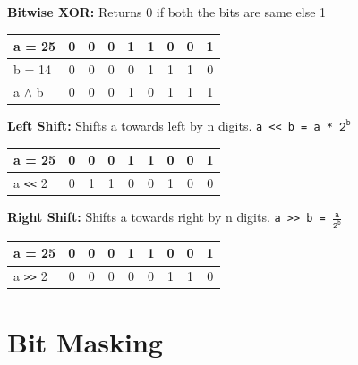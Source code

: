 \documentclass{report}
\begin{document}
\vspace{3ex}
\textbf{\large{Bitwise XOR}: }
Returns 0 if both the bits are same else 1

\begin{tabularx}{9cm}{|P{1.5cm}|C|C|C|C|C|C|C|C|}\hline
   a = 25 &
   0 & 0 & 0 & 1 & 1 & 0 & 0 & 1\\\hline
   b = 14 &
   0 & 0 & 0 & 0 & 1 & 1 & 1 & 0\\\hline
   a $\wedge$ b &
   0 & 0 & 0 & 1 & 0 & 1 & 1 & 1\\\hline
\end{tabularx}

\vspace{3ex}
\textbf{\large{Left Shift}: }
Shifts a towards left by n digits.
\texttt{a << b = a * $\texttt{2}^\texttt{b}$}

\begin{tabularx}{9cm}{|P{1.5cm}|C|C|C|C|C|C|C|C|}\hline
   a = 25 &
   0 & 0 & 0 & 1 & 1 & 0 & 0 & 1\\\hline
   a \texttt{<<} 2 &
   0 & 1 & 1 & 0 & 0 & 1 & 
   0 & 0\\\hline
\end{tabularx}

\vspace{3ex}
\textbf{\large{Right Shift}: }
Shifts a towards right by n digits.
\texttt{a >> b = $\frac{\texttt{a}}{\texttt{2}^\texttt{b}}$}

\begin{tabularx}{9cm}{|P{1.5cm}|C|C|C|C|C|C|C|C|}\hline
   a = 25 &
   0 & 0 & 0 & 1 & 1 & 0 & 0 & 1\\\hline
   a \texttt{>>} 2 &
   0 & 0 &
   0 & 0 & 0 & 1 & 1 & 0\\\hline
\end{tabularx}

\vspace{2ex}
\section{Bit Masking}
\end{document}
